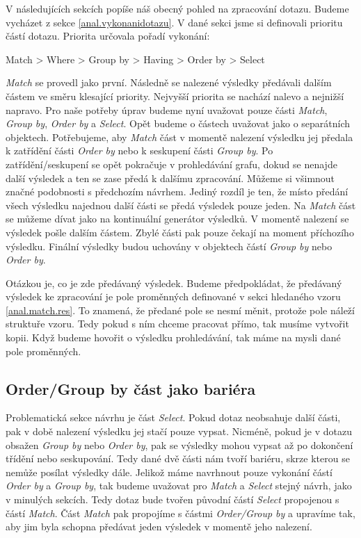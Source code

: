 V následujících sekcích popíše náš obecný pohled na zpracování dotazu.
Budeme vycházet z sekce \ref{anal.vykonanidotazu}.
V dané sekci jsme si definovali prioritu částí dotazu.
Priorita určovala pořadí vykonání:
\begin{code}
Match > Where > Group by > Having > Order by > Select
\end{code}
\textit{Match} se provedl jako první.
Následně se nalezené výsledky předávali dalším částem ve směru klesající priority.
Nejvyšší priorita se nachází nalevo a nejnižší napravo.
Pro naše potřeby úprav budeme nyní uvažovat pouze části \textit{Match}, \textit{Group by}, \textit{Order by} a \textit{Select}.
Opět budeme o částech uvažovat jako o separátních objektech.
Potřebujeme, aby \textit{Match} část v momentě nalezení výsledku jej předala k zatřídění části \textit{Order by} nebo k seskupení části \textit{Group by}.
Po zatřídění/seskupení se opět pokračuje v prohledávání grafu, dokud se nenajde další výsledek a ten se zase předá k dalšímu zpracování.
Můžeme si všimnout značné podobnosti s předchozím návrhem. 
Jediný rozdíl je ten, že místo předání všech výsledku najednou další části se předá výsledek pouze jeden.
Na \textit{Match} část se můžeme dívat jako na kontinuální generátor výsledků. 
V momentě nalezení se výsledek pošle dalším částem.
Zbylé části pak pouze čekají na moment příchozího výsledku.
Finální výsledky budou uchovány v objektech částí \textit{Group by} nebo \textit{Order by}. 

Otázkou je, co je zde předávaný výsledek.
Budeme předpokládat, že předávaný výsledek ke zpracování je pole proměnných definované v sekci hledaného vzoru \ref{anal.match.res}.
To znamená, že předané pole se nesmí měnit, protože pole náleží struktuře vzoru.
Tedy pokud s ním chceme pracovat přímo, tak musíme vytvořit kopii.
Když budeme hovořit o výsledku prohledávání, tak máme na mysli dané pole proměnných.

\subsection{Order/Group by část jako bariéra}

Problematická sekce návrhu je část \textit{Select}.
Pokud dotaz neobsahuje další části, pak v době nalezení výsledku jej stačí pouze vypsat.
Nicméně, pokud je v dotazu obsažen \textit{Group by} nebo \textit{Order by}, pak se výsledky mohou vypsat až po dokončení třídění nebo seskupování.
Tedy dané dvě části nám tvoří bariéru, skrze kterou se nemůže posílat výsledky dále.
Jelikož máme navrhnout pouze vykonání částí \textit{Order by} a \textit{Group by}, tak budeme uvažovat pro \textit{Match} a \textit{Select} stejný návrh, jako v minulých sekcích.
Tedy dotaz bude tvořen původní částí \textit{Select} propojenou s částí \textit{Match}.
Část \textit{Match} pak propojíme s částmi \textit{Order/Group by} a upravíme tak, aby jim byla schopna předávat jeden výsledek v momentě jeho nalezení.  

